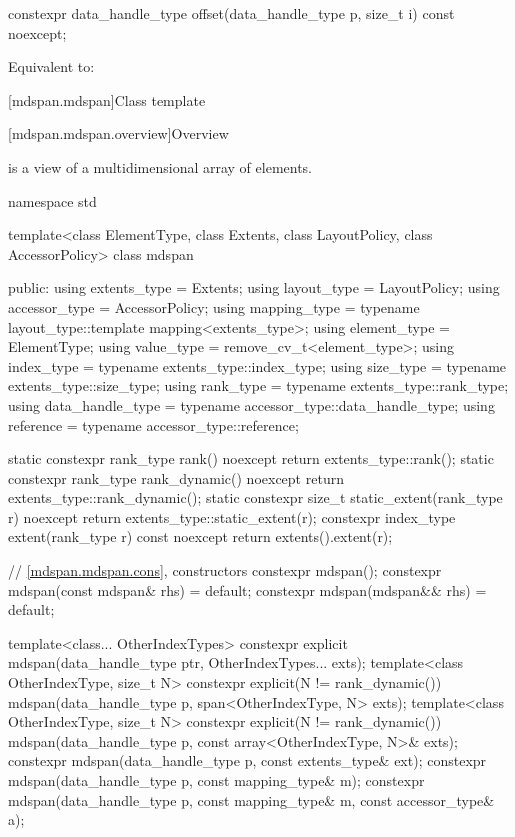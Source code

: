 %
\begin{itemdecl}
constexpr data_handle_type offset(data_handle_type p, size_t i) const noexcept;
\end{itemdecl}

\begin{itemdescr}
\pnum
\effects
Equivalent to: 
\end{itemdescr}

[mdspan.mdspan]{Class template }

[mdspan.mdspan.overview]{Overview}

\pnum
{} is a view of a multidimensional array of elements.

\begin{codeblock}
namespace std {
  template<class ElementType, class Extents, class LayoutPolicy, class AccessorPolicy>
  class mdspan {
  public:
    using extents_type = Extents;
    using layout_type = LayoutPolicy;
    using accessor_type = AccessorPolicy;
    using mapping_type = typename layout_type::template mapping<extents_type>;
    using element_type = ElementType;
    using value_type = remove_cv_t<element_type>;
    using index_type = typename extents_type::index_type;
    using size_type = typename extents_type::size_type;
    using rank_type = typename extents_type::rank_type;
    using data_handle_type = typename accessor_type::data_handle_type;
    using reference = typename accessor_type::reference;

    static constexpr rank_type rank() noexcept { return extents_type::rank(); }
    static constexpr rank_type rank_dynamic() noexcept { return extents_type::rank_dynamic(); }
    static constexpr size_t static_extent(rank_type r) noexcept
      { return extents_type::static_extent(r); }
    constexpr index_type extent(rank_type r) const noexcept { return extents().extent(r); }

    // \ref{mdspan.mdspan.cons}, constructors
    constexpr mdspan();
    constexpr mdspan(const mdspan& rhs) = default;
    constexpr mdspan(mdspan&& rhs) = default;

    template<class... OtherIndexTypes>
      constexpr explicit mdspan(data_handle_type ptr, OtherIndexTypes... exts);
    template<class OtherIndexType, size_t N>
      constexpr explicit(N != rank_dynamic())
        mdspan(data_handle_type p, span<OtherIndexType, N> exts);
    template<class OtherIndexType, size_t N>
      constexpr explicit(N != rank_dynamic())
        mdspan(data_handle_type p, const array<OtherIndexType, N>& exts);
    constexpr mdspan(data_handle_type p, const extents_type& ext);
    constexpr mdspan(data_handle_type p, const mapping_type& m);
    constexpr mdspan(data_handle_type p, const mapping_type& m, const accessor_type& a);

}}
\end{codeblock}
